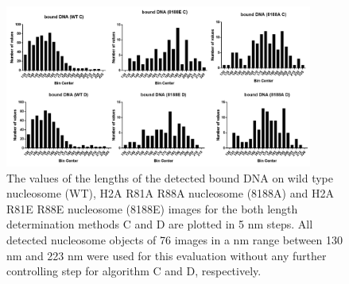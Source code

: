 \documentclass{article}
\begin{document}
%
\begin{figure}[!htb]
	\begin{center}
		\includegraphics[width = 0.9\textwidth]{hbound_DNA}
	\end{center}
	\caption{The values of the lengths of the detected bound DNA on wild type nucleosome (WT), H2A R81A R88A nucleosome (8188A) and H2A R81E R88E nucleosome (8188E) images for the both length determination methods C and D are plotted in 5 nm steps. All detected nucleosome objects of 76 images in a nm range between 130 nm and 223 nm were used for this evaluation without any further controlling step for algorithm C and D, respectively.}
	\label{fig: hbound DNA} %
\end{figure}
\end{document}
